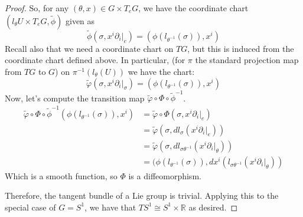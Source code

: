 \documentclass[fontsize=11pt]{scrartcl} %
\numberwithin{equation}{section} %
\numberwithin{figure}{section} %
\numberwithin{table}{section} %
\newcommand{\R}{\mathbb{R}}
\begin{document}
\begin{proof}
So, for any $(\theta, x)\in G\times T_eG$, we have the coordinate chart $(l_{\theta}U\times T_eG,\tilde{\phi})$
given as
\[
\widetilde{\phi}(\sigma,x^i\partial_i|_e) = (\phi(l_{\theta^{-1}}(\sigma)), x^i)
\]
Recall also that we need a coordinate chart on $TG$, but this is induced from the
coordinate chart defined above. In particular, (for $\pi$ the standard projection map
from $TG$ to $G$) on $\pi^{-1}(l_{\theta}(U))$ we have the
chart:
\[
\widetilde{\varphi}(\sigma,x^i\partial_i|_{\sigma}) = (\phi(l_{\theta^{-1}}(\sigma)),x^i)
\]
Now, let's compute the transition map $\widetilde{\varphi}\circ\Phi\circ\widetilde{\phi}^{-1}$.
\[
\begin{aligned}
\widetilde{\varphi}\circ\Phi\circ\widetilde{\phi}^{-1}(\phi(l_{\theta^{-1}}(\sigma)),x^i) &= \widetilde{\varphi}\circ\Phi(\sigma,x^i\partial_i|_e)\\
                &=\widetilde{\varphi}(\sigma,dl_{\sigma}(x^i\partial_i|_e))\\
                &=\widetilde{\varphi}(\sigma,dl_{\sigma\theta^{-1}}(x^i\partial_i|_{\theta}))\\
                &=(\phi(l_{\theta^{-1}}(\sigma)),dx^i(l_{\sigma\theta^{-1}}(x^i\partial_i|_{\theta}))
\end{aligned}
\]
Which is a smooth function, so $\Phi$ is a diffeomorphism.

Therefore, the tangent bundle of a Lie group is trivial.
Applying this to the special case of $G=S^1$, we have that $TS^1\cong S^1\times\R$ as
desired.
\end{proof}

\end{document}
